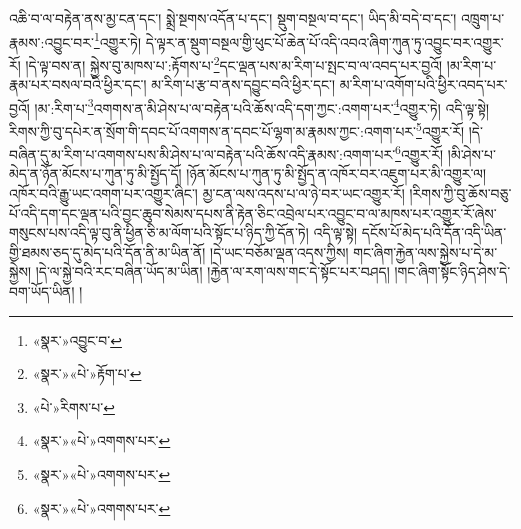 འཆི་བ་ལ་བརྟེན་ནས་མྱ་ངན་དང་། སྨྲེ་སྔགས་འདོན་པ་དང་། སྡུག་བསྔལ་བ་དང་། ཡིད་མི་བདེ་བ་དང་། འཁྲུག་པ་རྣམས་:འབྱུང་བར་\footnote{«སྣར་»འབྱུང་བ་}འགྱུར་ཏེ། དེ་ལྟར་ན་སྡུག་བསྔལ་གྱི་ཕུང་པོ་ཆེན་པོ་འདི་འབའ་ཞིག་ཀུན་ཏུ་འབྱུང་བར་འགྱུར་རོ། །དེ་ལྟ་བས་ན། སྐྱེས་བུ་མཁས་པ་:རྟོགས་པ་\footnote{«སྣར་»«པེ་»རྟོག་པ་}དང་ལྡན་པས་མ་རིག་པ་སྤང་བ་ལ་འབད་པར་བྱའོ། །མ་རིག་པ་རྣམ་པར་བསལ་བའི་ཕྱིར་དང་། མ་རིག་པ་རྩ་བ་ནས་དབྱུང་བའི་ཕྱིར་དང་། མ་རིག་པ་འགོག་པའི་ཕྱིར་འབད་པར་བྱའོ། །མ་:རིག་པ་\footnote{«པེ་»རིགས་པ་}འགགས་ན་མི་ཤེས་པ་ལ་བརྟེན་པའི་ཆོས་འདི་དག་ཀྱང་:འགག་པར་\footnote{«སྣར་»«པེ་»འགགས་པར་}འགྱུར་ཏེ། འདི་ལྟ་སྟེ། རིགས་ཀྱི་བུ་དཔེར་ན་སྲོག་གི་དབང་པོ་འགགས་ན་དབང་པོ་ལྷག་མ་རྣམས་ཀྱང་:འགག་པར་\footnote{«སྣར་»«པེ་»འགགས་པར་}འགྱུར་རོ། །དེ་བཞིན་དུ་མ་རིག་པ་འགགས་པས་མི་ཤེས་པ་ལ་བརྟེན་པའི་ཆོས་འདི་རྣམས་:འགག་པར་\footnote{«སྣར་»«པེ་»འགགས་པར་}འགྱུར་རོ། །མི་ཤེས་པ་མེད་ན་ཉོན་མོངས་པ་ཀུན་ཏུ་མི་སྤྱོད་དོ། །ཉོན་མོངས་པ་ཀུན་ཏུ་མི་སྤྱོད་ན་འཁོར་བར་འཇུག་པར་མི་འགྱུར་ལ། འཁོར་བའི་རྒྱུ་ཡང་འགག་པར་འགྱུར་ཞིང་། མྱ་ངན་ལས་འདས་པ་ལ་ཉེ་བར་ཡང་འགྱུར་རོ། །རིགས་ཀྱི་བུ་ཆོས་བཅུ་པོ་འདི་དག་དང་ལྡན་པའི་བྱང་ཆུབ་སེམས་དཔས་ནི་རྟེན་ཅིང་འབྲེལ་པར་འབྱུང་བ་ལ་མཁས་པར་འགྱུར་རོ་ཞེས་གསུངས་པས་འདི་ལྟ་བུ་ནི་ཕྱིན་ཅི་མ་ལོག་པའི་སྟོང་པ་ཉིད་ཀྱི་དོན་ཏེ། འདི་ལྟ་སྟེ། དངོས་པོ་མེད་པའི་དོན་འདི་ཡིན་གྱི་ཐམས་ཅད་དུ་མེད་པའི་དོན་ནི་མ་ཡིན་ནོ། །དེ་ཡང་བཅོམ་ལྡན་འདས་ཀྱིས། གང་ཞིག་རྐྱེན་ལས་སྐྱེས་པ་དེ་མ་སྐྱེས། །དེ་ལ་སྐྱེ་བའི་རང་བཞིན་ཡོད་མ་ཡིན། །རྐྱེན་ལ་རག་ལས་གང་དེ་སྟོང་པར་བཤད། །གང་ཞིག་སྟོང་ཉིད་ཤེས་དེ་བག་ཡོད་ཡིན། །
